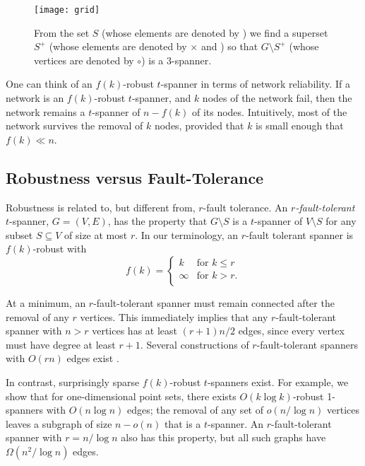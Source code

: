 \documentclass{patmorin}
\begin{document}
\begin{figure}
  \begin{center}
    \texttt{[image: grid]}
  \end{center}
  \caption{From the set $S$ (whose elements are denoted by \textbullet)
  we find a superset $S^+$ (whose elements are denoted by $\times$ and
  \textbullet) so that $G\setminus S^+$ (whose vertices are denoted by
  $\circ$) is a 3-spanner.}
\end{figure}

One can think of an $f(k)$-robust $t$-spanner in terms of network
reliability.  If a network is an $f(k)$-robust $t$-spanner, and $k$ nodes
of the network fail, then the network remains a $t$-spanner of $n-f(k)$
of its nodes.  Intuitively, most of the network survives the removal of
$k$ nodes, provided that $k$ is small enough that $f(k)\ll n$.

\subsection{Robustness versus Fault-Tolerance}

Robustness is related to, but different from, $r$-fault tolerance.
An \emph{$r$-fault-tolerant} $t$-spanner, $G=(V,E)$, has the property
that $G\setminus S$ is a $t$-spanner of $V\setminus S$ for any subset
$S\subseteq V$ of size at most $r$.  In our terminology, an $r$-fault
tolerant spanner is $f(k)$-robust with
\[
    f(k) = \begin{cases}k & \text{for $k \le r$}  \\
                   \infty & \text{for $k > r$.}  \\
   \end{cases}
\]

At a minimum, an $r$-fault-tolerant spanner must remain connected
after the removal of any $r$ vertices.  This immediately implies
that any $r$-fault-tolerant spanner with $n>r$ vertices has at least
$(r+1)n/2$ edges, since every vertex must have degree at least $r+1$.
Several constructions of $r$-fault-tolerant spanners with $O(rn)$ edges
exist \cite{cz04,lns02,l99}.

In contrast, surprisingly sparse $f(k)$-robust $t$-spanners exist.
For example, we show that for one-dimensional point sets, there exists
$O(k\log k)$-robust 1-spanners with $O(n\log n)$ edges; the removal of
any set of $o(n/\log n)$ vertices leaves a subgraph of size $n-o(n)$ that
is a $t$-spanner.  An $r$-fault-tolerant spanner with $r=n/\log n$ also
has this property, but all such graphs have $\Omega(n^2/\log n)$ edges.
\end{document}

